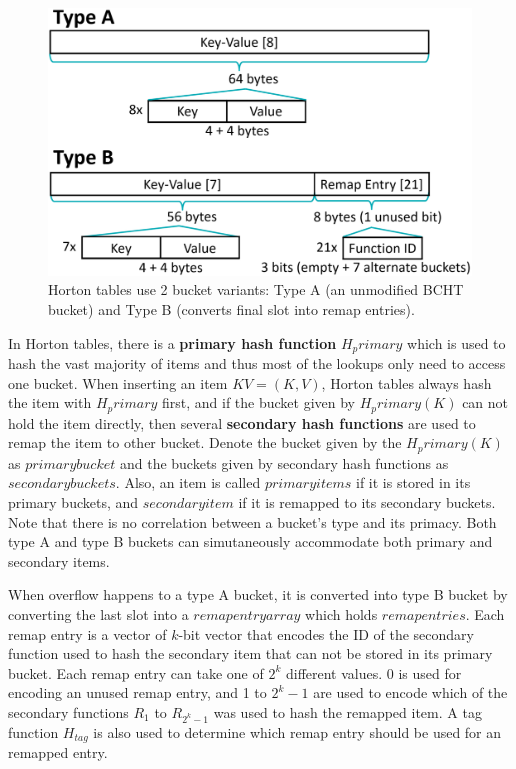 \documentclass[12pt,conference,compsoc]{IEEEtran}
\begin{document}
\begin{figure}
    \centering
    \includegraphics[width=\linewidth]{2-type-buckets.png}
    \caption{Horton tables use 2 bucket variants: Type A (an unmodified BCHT bucket) and Type B (converts final slot into remap entries).} \label{fig:bucket-type}
\end{figure}

In Horton tables, there is a \textbf{primary hash function} $H_primary$ which is used to hash the vast majority of items and thus most of the lookups only need to access one bucket. When inserting an item $KV=(K,V)$, Horton tables always hash the item with $H_primary$ first, and if the bucket given by $H_primary(K)$ can not hold the item directly, then several \textbf{secondary hash functions} are used to remap the item to other bucket. Denote the bucket given by the $H_primary(K)$ as $primary bucket$ and the buckets given by secondary hash functions as $secondary buckets$. Also, an item is called $primary items$ if it is stored in its primary buckets, and $secondary item$ if it is remapped to its secondary buckets. Note that there is no correlation between a bucket's type and its primacy. Both type A and type B buckets can simutaneously accommodate both primary and secondary items.

When overflow happens to a type A bucket, it is converted into type B bucket by converting the last slot into a $remap entry array$ which holds $remap entries$. Each remap entry is a vector of $k$-bit vector that encodes the ID of the secondary function used to hash the secondary item that can not be stored in its primary bucket. Each remap entry can take one of $2^k$ different values. 0 is used for encoding an unused remap entry, and 1 to $2^k-1$ are used to encode which of the secondary functions $R_1$ to $R_{2^k-1}$ was used to hash the remapped item. A tag function $H_{tag}$ is also used to determine which remap entry should be used for an remapped entry.
\end{document}
